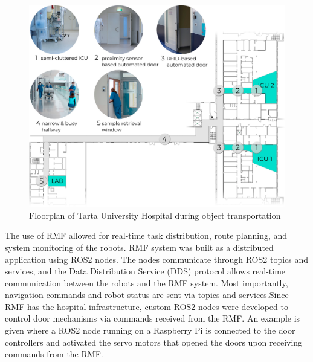 \vspace{1.0em}
\begin{figure}[H]
    \centering
    \includegraphics[width=5.5in]{pics/floor_tarta.png}
    \caption[Floorplan of Tarta University Hospital during object transportation]{Floorplan of Tarta University Hospital during object transportation~\cite{valner2022scalable}}\label{tarta1}
\end{figure} 

\vspace{-0.1em}

\noindent The use of RMF allowed for real-time task distribution, route planning, and system monitoring of the robots. RMF system was built as a
distributed application using ROS2 nodes. The nodes communicate through ROS2 topics and services, and the Data Distribution Service (DDS) protocol
allows real-time communication between the robots and the RMF system. Most importantly, navigation commands and robot status are sent via topics and
services.\@ Since RMF has the hospital infrastructure, custom ROS2 nodes were developed to control door mechanisms via commands received from the RMF.\@
An example is given where a ROS2 node running on a Raspberry Pi is connected to the door controllers and activated the servo motors that
opened the doors upon receiving commands from the RMF.\@ 


